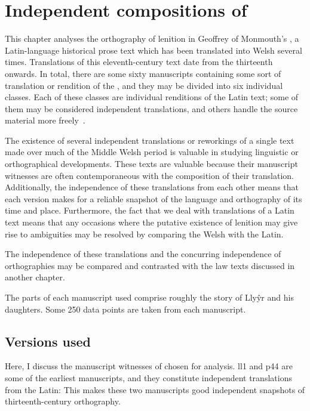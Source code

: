 \chapter{Independent compositions of }
This chapter analyses the orthography of lenition in Geoffrey of Monmouth's , a Latin-language historical prose text which has been translated into Welsh several times.
Translations of this eleventh-century text date from the thirteenth onwards.
In total, there are some sixty manuscripts containing some sort of translation or rendition of the , and they may be divided into six individual classes.
Each of these classes are individual renditions of the Latin text; some of them may be considered independent translations, and others handle the source material more freely~\autocite[xxiv-xxxi]{roberts_brut_1971}.

The existence of several independent translations or reworkings of a single text made over much of the Middle Welsh period is valuable in studying linguistic or orthographical developments.
These texts are valuable because their manuscript witnesses are often contemporaneous with the composition of their translation. Additionally, the independence of these translations from each other means that each version makes for a reliable snapshot of the language and orthography of its time and place.
Furthermore, the fact that we deal with translations of a Latin text means that any occasions where the putative existence of lenition may give rise to ambiguities may be resolved by comparing the Welsh with the Latin. 

The independence of these translations and the concurring independence of orthographies may be compared and contrasted with the law texts discussed in another chapter.

The parts of each manuscript used comprise roughly the story of Lly\^yr and his daughters.
Some 250 data points are taken from each manuscript.


\section{Versions used}
Here, I discuss the manuscript witnesses of  chosen for analysis. \Gls{ll1} and \gls{p44} are some of the earliest manuscripts, and they constitute independent translations from the Latin:
This makes these two manuscripts good independent snapshots of thirteenth-century orthography.

